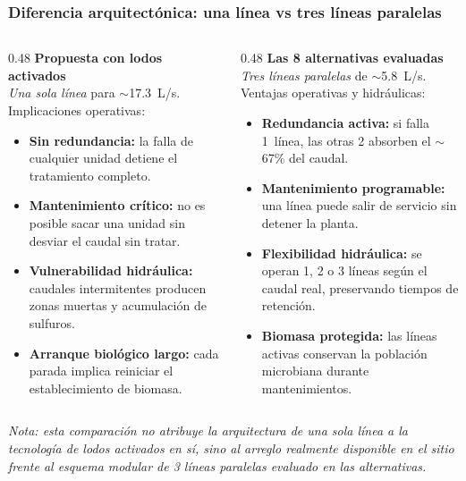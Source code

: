 \documentclass[aspectratio=169]{beamer}
\begin{document}
\begin{frame}
\frametitle{Diferencia arquitect\'{o}nica: una l\'{i}nea vs tres l\'{i}neas paralelas}
\begin{columns}[T]
\begin{column}{0.48\textwidth}
\textbf{Propuesta con lodos activados}\\[2pt]
\footnotesize
\textit{Una sola l\'{i}nea} para $\sim$17.3~L/s.\\[2pt]
\textcolor{rojomalo}{Implicaciones operativas:}
\begin{itemize}
\setlength{\itemsep}{0pt}
\setlength{\topsep}{1pt}
\item \textbf{Sin redundancia:} la falla de cualquier unidad detiene el tratamiento completo.
\item \textbf{Mantenimiento cr\'{i}tico:} no es posible sacar una unidad sin desviar el caudal sin tratar.
\item \textbf{Vulnerabilidad hidr\'{a}ulica:} caudales intermitentes producen zonas muertas y acumulaci\'{o}n de sulfuros.
\item \textbf{Arranque biol\'{o}gico largo:} cada parada implica reiniciar el establecimiento de biomasa.
\end{itemize}
\end{column}
\begin{column}{0.48\textwidth}
\textbf{Las 8 alternativas evaluadas}\\[2pt]
\footnotesize
\textit{Tres l\'{i}neas paralelas} de $\sim$5.8~L/s.\\[2pt]
\textcolor{verdebueno}{Ventajas operativas y hidr\'{a}ulicas:}
\begin{itemize}
\setlength{\itemsep}{0pt}
\setlength{\topsep}{1pt}
\item \textbf{Redundancia activa:} si falla 1~l\'{i}nea, las otras 2 absorben el $\sim$67\% del caudal.
\item \textbf{Mantenimiento programable:} una l\'{i}nea puede salir de servicio sin detener la planta.
\item \textbf{Flexibilidad hidr\'{a}ulica:} se operan 1, 2 o 3 l\'{i}neas seg\'{u}n el caudal real, preservando tiempos de retenci\'{o}n.
\item \textbf{Biomasa protegida:} las l\'{i}neas activas conservan la poblaci\'{o}n microbiana durante mantenimientos.
\end{itemize}
\end{column}
\end{columns}

\vspace{4pt}
\centering
\scriptsize
\textit{Nota: esta comparaci\'{o}n no atribuye la arquitectura de una sola l\'{i}nea a la tecnolog\'{i}a de lodos activados en s\'{i}, sino al arreglo realmente disponible en el sitio frente al esquema modular de 3 l\'{i}neas paralelas evaluado en las alternativas.}
\end{frame}
\end{document}
